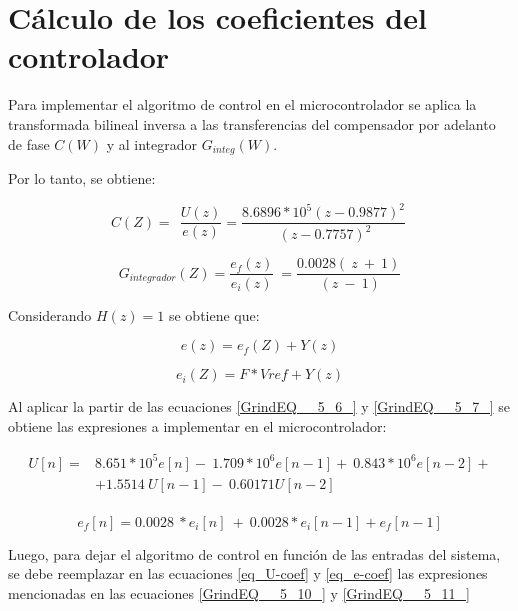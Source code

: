 \section{Cálculo de los coeficientes del controlador}

\noindent Para implementar el algoritmo de control en el microcontrolador se aplica la transformada bilineal inversa a las transferencias del compensador por adelanto de fase $C(W)$ y al integrador $G_{integ}(W)$.

\noindent Por lo tanto, se obtiene:

\begin{equation} \label{GrindEQ__5_6_} 
	C(Z)=\ \ \frac{U(z)}{e(z)}=\frac{8.6896*10^5(z-0.9877)^2}{\ (z-0.7757)^2}\  
\end{equation} 

\begin{equation} \label{GrindEQ__5_7_} 
	G_{integrador}(Z)=\frac{e_f(z)}{e_i(z)}\ =\frac{0.0028(\ z\ +\ 1)}{\ (z\ -\ 1)} 
\end{equation} 

\noindent Considerando $H(z)=1$ se obtiene que:

\begin{equation} \label{GrindEQ__5_39_} 
	e(z)=e_f(Z)+Y(z) 
\end{equation} 

\begin{equation} \label{GrindEQ__5_40_} 
	e_i(Z)=F*Vref+Y(z) 
\end{equation} 


\noindent Al aplicar la partir de las ecuaciones \ref{GrindEQ__5_6_} y \ref{GrindEQ__5_7_} se obtiene las expresiones a implementar en el microcontrolador:

\begin{equation} 
	\begin{aligned}\label{eq_U-coef}
	U[n]=&8.651*10^5e[n]-\ 1.709*10^6e[n-1]+\ 0.843*10^6e[n-2]+\\
		 &+1.5514\ U[n-1]-\ 0.60171U[n-2]\\ 
	\end{aligned}
\end{equation}

\begin{equation} \label{eq_e-coef} 
	e_f[n]=0.0028{\ *e}_i[n]\ +\ {0.0028*e}_i[n-1]+e_f[n-1] 
\end{equation} 


\noindent Luego, para dejar el algoritmo de control en funci\'{o}n de las entradas del sistema, se debe reemplazar en las ecuaciones \ref{eq_U-coef} y \ref{eq_e-coef} las expresiones mencionadas en las ecuaciones \ref{GrindEQ__5_10_} y \ref{GrindEQ__5_11_}

